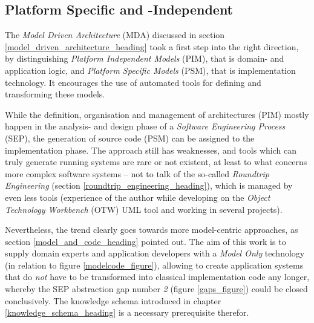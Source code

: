 %
%
%
%
%
%
%

\subsection{Platform Specific and -Independent}
\label{platform_specific_and_independent_heading}

The \emph{Model Driven Architecture} (MDA) discussed in section
\ref{model_driven_architecture_heading} took a first step into the right
direction, by distinguishing \emph{Platform Independent Models} (PIM), that is
domain- and application logic, and \emph{Platform Specific Models} (PSM), that
is implementation technology. It encourages the use of automated tools for
defining and transforming these models.

While the definition, organisation and management of architectures (PIM) mostly
happen in the analysis- and design phase of a \emph{Software Engineering Process}
(SEP), the generation of source code (PSM) can be assigned to the implementation
phase. The approach still has weaknesses, and tools which can truly generate
running systems are rare or not existent, at least to what concerns more complex
software systems -- not to talk of the so-called \emph{Roundtrip Engineering}
(section \ref{roundtrip_engineering_heading}), which is managed by even less
tools (experience of the author while developing on the
\emph{Object Technology Workbench} (OTW) UML tool \cite{otw} and working in
several projects).

Nevertheless, the trend clearly goes towards more model-centric approaches, as
section \ref{model_and_code_heading} pointed out. The aim of this work is to
supply domain experts and application developers with a \emph{Model Only}
technology (in relation to figure \ref{modelcode_figure}), allowing to create
application systems that do \emph{not} have to be transformed into classical
implementation code any longer, whereby the SEP abstraction gap number \emph{2}
(figure \ref{gaps_figure}) could be closed conclusively. The knowledge schema
introduced in chapter \ref{knowledge_schema_heading} is a necessary
prerequisite therefor.
